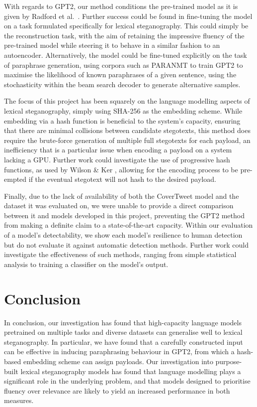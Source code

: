 \documentclass[12pt,a4paper]{article}
\begin{document}
With regards to GPT2, our method conditions the pre-trained model as it is given by Radford et al.\ \citeyear{gpt2}. Further success could be found in fine-tuning the model on a task formulated specifically for lexical steganography. This could simply be the reconstruction task, with the aim of retaining the impressive fluency of the pre-trained model while steering it to behave in a similar fashion to an autoencoder. Alternatively, the model could be fine-tuned explicitly on the task of paraphrase generation, using corpora such as P{\footnotesize ARA}NMT to train GPT2 to maximise the likelihood of known paraphrases of a given sentence, using the stochasticity within the beam search decoder to generate alternative samples.

The focus of this project has been squarely on the language modelling aspects of lexical steganography, simply using SHA-256 as the embedding scheme. While embedding via a hash function is beneficial to the system's capacity, ensuring that there are minimal collisions between candidate stegotexts, this method does require the brute-force generation of multiple full stegotexts for each payload, an inefficiency that is a particular issue when encoding a payload on a system lacking a GPU. Further work could investigate the use of progressive hash functions, as used by Wilson \& Ker \citeyear{covertweet}, allowing for the encoding process to be pre-empted if the eventual stegotext will not hash to the desired payload. 

Finally, due to the lack of availability of both the CoverTweet model and the dataset it was evaluated on, we were unable to provide a direct comparison between it and models developed in this project, preventing the GPT2 method from making a definite claim to a state-of-the-art capacity. Within our evaluation of a model's detectability, we show each model's resilience to human detection but do not evaluate it against automatic detection methods. Further work could investigate the effectiveness of such methods, ranging from simple statistical analysis to training a classifier on the model's output.

\section{Conclusion}
\noindent In conclusion, our investigation has found that high-capacity language models pretrained on multiple tasks and diverse datasets can generalise well to lexical steganography. In particular, we have found that a carefully constructed input can be effective in inducing paraphrasing behaviour in GPT2, from which a hash-based embedding scheme can assign payloads. Our investigation into purpose-built lexical steganography models has found that language modelling plays a significant role in the underlying problem, and that models designed to prioritise fluency over relevance are likely to yield an increased performance in both measures.
\end{document}
